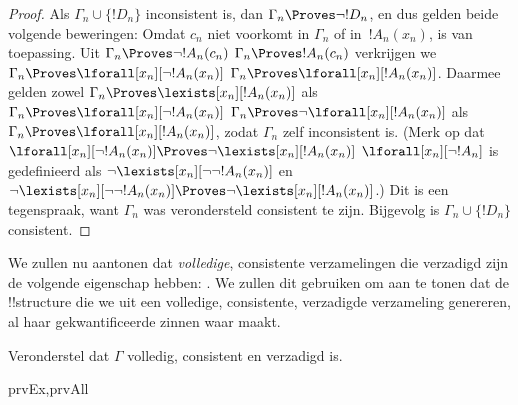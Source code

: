 \documentclass[../../../include/open-logic-section]{subfiles}
\begin{document}
\begin{proof}
Als $\Gamma_n \cup \{!D_n\}$ inconsistent is, dan $\Gamma_n
\Proves \lnot !D_n$, en dus gelden beide volgende beweringen:
Omdat $c_n$ niet voorkomt in
$\Gamma_n$ of in~$!A_n(x_n)$, is
van toepassing. Uit 
{$\Gamma_n \Proves \lnot !A_n(c_n)$}
{$\Gamma_n \Proves !A_n(c_n)$}
verkrijgen we
{$\Gamma_n \Proves \lforall[x_n][\lnot !A_n(x_n)]$}
{$\Gamma_n \Proves \lforall[x_n][!A_n(x_n)]$}.
Daarmee gelden zowel
{$\Gamma_n \Proves \lexists[x_n][!A_n(x_n)]$ als
$\Gamma_n \Proves \lforall[x_n][\lnot !A_n(x_n)]$}
{$\Gamma_n \Proves \lnot\lforall[x_n][!A_n(x_n)]$ als
$\Gamma_n \Proves \lforall[x_n][!A_n(x_n)]$},
zodat $\Gamma_n$ zelf inconsistent is.
{(Merk op dat
{$\lforall[x_n][\lnot !A_n(x_n)] \Proves
  \lnot\lexists[x_n][!A_n(x_n)]$}
{$\lforall[x_n][\lnot !A_n]$ is gedefinieerd als
  $\lnot\lexists[x_n][\lnot\lnot !A_n(x_n)]$ en
  $\lnot\lexists[x_n][\lnot\lnot !A_n(x_n)] \Proves
  \lnot\lexists[x_n][!A_n(x_n)]$}.)}{}
Dit is een tegenspraak, want $\Gamma_n$ was verondersteld consistent te
zijn. Bijgevolg is $\Gamma_n \cup \{ !D_n\}$ consistent.
\end{proof}

\begin{explain}
We zullen nu aantonen dat \emph{volledige}, consistente verzamelingen die
verzadigd zijn de volgende eigenschap hebben: . We zullen dit gebruiken om aan te tonen dat de !!{structure}
die we uit een volledige, consistente, verzadigde verzameling genereren,
al haar gekwantificeerde zinnen waar maakt.
\end{explain}

\begin{prop}
Veronderstel dat $\Gamma$ volledig, consistent en verzadigd is.
\begin{tagenumerate}{prvEx,prvAll}
\end{tagenumerate}
\end{prop}
\end{document}
